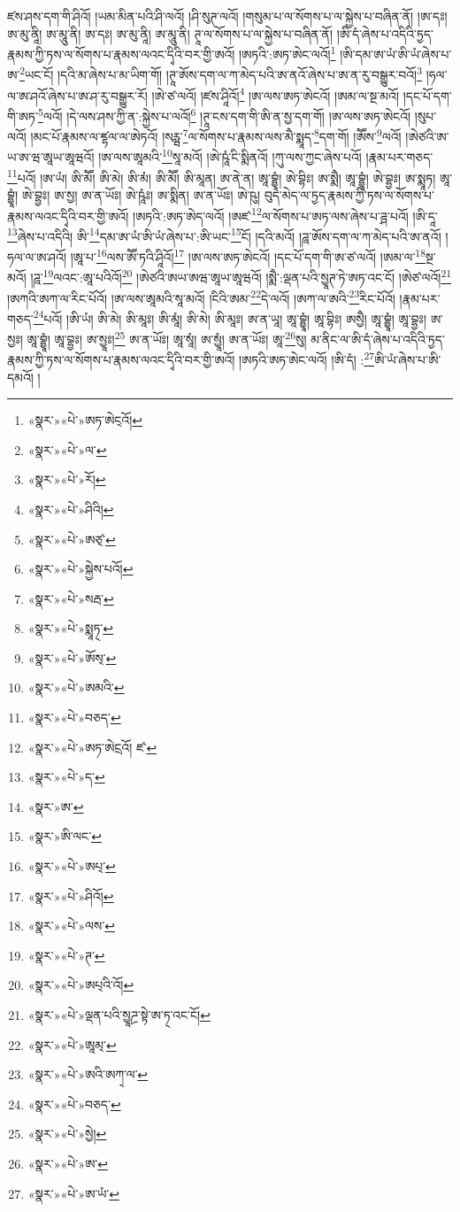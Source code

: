 ཛས་ཤས་དག་གི་ཤིའོ། །ཡམ་མིན་པའི་ཤི་ལའོ། །ཤི་སུཊ་ལའོ། །གསུམ་པ་ལ་སོགས་པ་ལ་སྐྱེས་པ་བཞིན་ནོ། །ཨ་དཿ། ཨ་མུ་ནཱི། ཨ་མཱུ་ནི། ཨ་དཿ། ཨ་མུ་ནཱི། ཨ་མཱུ་ནི། ཊཱ་ལ་སོགས་པ་ལ་སྐྱེས་པ་བཞིན་ནོ། །ཨི་དཾ་ཞེས་པ་འདིའི་ཏྱད་རྣམས་ཀྱི་ཏས་ལ་སོགས་པ་རྣམས་ལའང་དྭིའི་བར་གྱི་ཨའོ། །ཨཏའི་:ཨཏ་ཨེང་ལའོ།\footnote{«སྣར་»«པེ་»ཨཏ་ཨེང྄འོ།} །ཨི་དམ་ཨ་ཡཾ་ཨི་ཡཾ་ཞེས་པ་ཨ་\footnote{«སྣར་»«པེ་»ལ་}ཡང་ངོ། །དའི་མ་ཞེས་པ་མ་ཡིག་གོ། །ཊཱ་ཨོས་དག་ལ་ཀ་མེད་པའི་ཨ་ནའོ་ཞེས་པ་ཨ་ན་རུ་བསྒྱུར་བའོ།\footnote{«སྣར་»«པེ་»རོ།} །ཧལ་ལ་ཨ་ཤའོ་ཞེས་པ་ཨ་ཤ་རུ་བསྒྱུར་རོ། །ཨེ་ཙ་ལའོ། །ཛས་ཤཱིའོ།\footnote{«སྣར་»«པེ་»ཤིའི།} །ཨ་ལས་ཨཏ་ཨེངའོ། །ཨམ་ལ་སྔ་མའོ། །དང་པོ་དག་གི་ཨཏ་\footnote{«སྣར་»«པེ་»ཨཙ྄་}ལའོ། །དེ་ལས་ཤས་ཀྱི་ན་:སྐྱེས་པ་ལའོ།\footnote{«སྣར་»«པེ་»སྐྱེས་པའོ།} །ཊཱ་ངས་དག་གི་ཨི་ན་སྱ་དག་གོ། །ཨ་ལས་ཨཏ་ཨེངའོ། །སུཔ་ལའོ། །མང་པོ་རྣམས་ལ་ཛྷལ་ལ་ཨེཏའོ། །སཪྺ་\footnote{«སྣར་»«པེ་»སརྦ་}ལ་སོགས་པ་རྣམས་ལས་མཻ་སྨཱད་\footnote{«སྣར་»«པེ་»སྨཱཏ྄་}དག་གོ། །ཨཽས་\footnote{«སྣར་»«པེ་»ཨོས྄་}ལའོ། །ཨེཙའི་ཨ་ཡ་ཨ་ཝ་ཨཱཡ་ཨཱཝའོ། །ཨ་ལས་ཨཱམའི་\footnote{«སྣར་»«པེ་»ཨམའི་}སཱ་མའོ། །ཨེ་ཥཱཾ་ངི་སྨིནའོ། །ཀུ་ལས་ཀྱང་ཞེས་པའོ། །རྣམ་པར་གཅད་\footnote{«སྣར་»«པེ་»བཅད་}པའོ། །ཨ་ཡཾ། ཨི་མཽ། ཨི་མེ། ཨི་མཾ། ཨི་མཽ། ཨི་མཱན། ཨ་ནེ་ན། ཨཱ་བྷྱཱཾ། ཨེ་བྷིཿ། ཨ་སྨཻ། ཨཱ་བྷྱཱཾ། ཨེ་བྷྱཿ། ཨ་སྨཱཏ། ཨཱ་བྷྱཱཾ། ཨེ་བྷྱཿ། ཨ་སྱ། ཨ་ན་ཡོཿ། ཨེ་ཥཱཾཿ། ཨ་སྨིན། ཨ་ན་ཡོཿ། ཨེ་ཥུ། བུད་མེད་ལ་ཏྱད་རྣམས་ཀྱི་ཏས་ལ་སོགས་པ་རྣམས་ལའང་དྭིའི་བར་གྱི་ཨའོ། །ཨཏའི་:ཨཏ་ཨེད་ལའོ། །ཨཛ་\footnote{«སྣར་»«པེ་»ཨཏ་ཨེངྲའོ། ཛ་}ལ་སོགས་པ་ཨཏ་ལས་ཞེས་པ་ཌྴ་པའོ། །ཨི་དཱ་\footnote{«སྣར་»«པེ་»ད་}ཞེས་པ་འདིའི། ཨི་\footnote{«སྣར་»ཨ་}དམ་ཨ་ཡཾ་ཨི་ཡཾ་ཞེས་པ་:ཨི་ཡང་\footnote{«སྣར་»ཨི་ལང་}ངོ། །དའི་མའོ། །ཌཱ་ཨོས་དག་ལ་ཀ་མེད་པའི་ཨ་ནའོ། །ཧལ་ལ་ཨ་ཤའོ། །ཨཱ་པ་\footnote{«སྣར་»«པེ་»ཨཔ྄་}ལས་ཨཽ་ཏའི་ཤཱིའོ།\footnote{«སྣར་»«པེ་»ཤིའོ།} །ཨ་ལས་ཨཏ་ཨེངའོ། །དང་པོ་དག་གི་ཨ་ཙ་ལའོ། །ཨམ་ལ་\footnote{«སྣར་»«པེ་»ལས་}སྔ་མའོ། །ཌཱ་\footnote{«སྣར་»«པེ་»ཊ་}ལའང་:ཨཱ་པའིའོ།\footnote{«སྣར་»«པེ་»ཨཔ྄འི་འོ།} །ཨེཙའི་ཨཡ་ཨཝ་ཨཱཡ་ཨཱཝའོ། །སྨཻ་:ལྡན་པའི་སྱཱཊ་ཏེ་ཨཏ་འང་ངོ། །ཨེཙ་ལའོ།\footnote{«སྣར་»«པེ་»ལྡན་པའི་སྱཱཌྲ་སྟེ་ཨ་ཏ྄་འང་ངོ།} །ཨཀའི་ཨཀ་ལ་རིང་པོའོ། །ཨ་ལས་ཨཱམའི་སཱ་མའོ། །ངིའི་ཨམ་\footnote{«སྣར་»«པེ་»ཨཱམ྄་}དེ་ལའོ། །ཨཀ་ལ་ཨའི་\footnote{«སྣར་»«པེ་»ཨའི་ཨཀ྄་ལ་}རིང་པོའོ། །རྣམ་པར་གཅད་\footnote{«སྣར་»«པེ་»བཅད་}པའོ། །ཨི་ཡཾ། ཨི་མེ། ཨི་མཱཿ། ཨི་མཱཾ། ཨི་མེ། ཨི་མཱཿ། ཨ་ན་ཡཱ། ཨཱ་བྷྱཱཾ། ཨཱ་བྷིཿ། ཨསྱཻ། ཨཱ་བྷྱཱཾ། ཨཱ་བྷྱཿ། ཨ་སྱཿ། ཨཱ་བྷྱཱཾ། ཨཱ་བྷྱཿ། ཨ་སྱཱཿ།\footnote{«སྣར་»«པེ་»སྱེ།} ཨ་ན་ཡོཿ། ཨཱ་སཱཾ། ཨ་སྱཱཾ། ཨ་ན་ཡོཿ། ཨཱ་\footnote{«སྣར་»«པེ་»ཨ་}སུ། མ་ནིང་ལ་ཨི་དཾ་ཞེས་པ་འདིའི་ཏྱད་རྣམས་ཀྱི་ཏས་ལ་སོགས་པ་རྣམས་ལའང་དྭིའི་བར་གྱི་ཨའོ། །ཨཏའི་ཨཏ་ཨེང་ལའོ། །ཨི་དཾ། :\footnote{«སྣར་»«པེ་»ཨ་ཡཾ་}ཨི་ཡཾ་ཞེས་པ་ཨི་དམའོ། །
